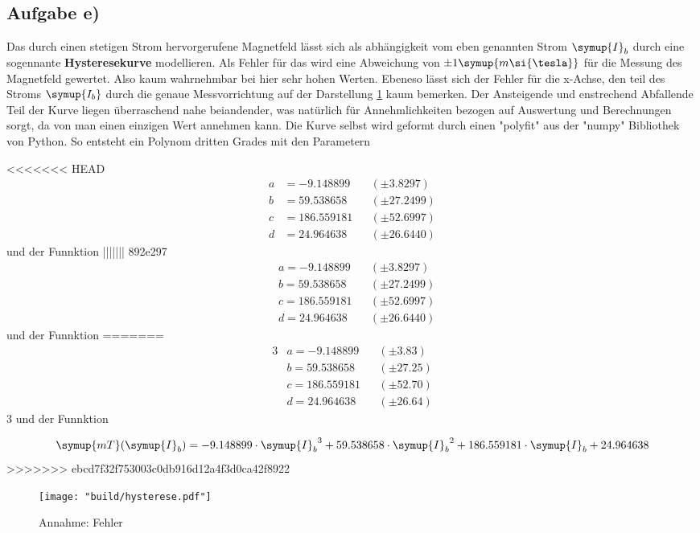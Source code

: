 \subsection{Aufgabe e)}
\label{sec:auswertung_hyst}

 
 Das durch einen stetigen Strom hervorgerufene Magnetfeld lässt sich als abhängigkeit vom eben genannten Strom $\symup{I}_b$ durch eine sogennante \textbf{Hysteresekurve} modellieren.
 Als Fehler für das wird eine Abweichung von $\pm 1 \symup{m\si{\tesla}}$ für die Messung des Magnetfeld gewertet. Also kaum wahrnehmbar bei hier sehr hohen Werten. Ebeneso lässt sich der Fehler für die x-Achse, den teil des Stroms 
 $\symup{I_b}$ durch die genaue Messvorrichtung auf der Darstellung \ref{fig:Bfeld} kaum bemerken.
 Der Ansteigende und enstrechend Abfallende Teil der Kurve liegen überraschend nahe beiandender, was natürlich für Annehmlichkeiten bezogen auf Auswertung und Berechnungen sorgt, da von man einen einzigen Wert annehmen kann.
 Die Kurve selbst wird geformt durch einen "polyfit" aus der "numpy" Bibliothek von Python. So entsteht ein Polynom dritten Grades mit den Parametern 

<<<<<<< HEAD
\begin{align*}
a &= -9.148899 &&(\pm 3.8297) \\
b &= 59.538658 &&(\pm 27.2499) \\
c &= 186.559181 &&(\pm 52.6997) \\
d &= 24.964638 &&(\pm 26.6440 )
\end{align*}
 und der Funnktion
||||||| 892e297
\begin{align*}
&a = -9.148899 &&(\pm 3.8297) \\
&b = 59.538658 &&(\pm 27.2499) \\
&c = 186.559181 &&(\pm 52.6997) \\
&d = 24.964638 &&(\pm 26.6440 )
\end{align*}
 und der Funnktion
=======
\begin{alignat*}{3}
&a = -9.148899 &&(\pm 3.83) \\
&b = 59.538658 &&(\pm 27.25) \\
&c = 186.559181 &&(\pm 52.70) \\
&d = 24.964638 &&(\pm 26.64)
\end{alignat*}{3}
und der Funnktion

\begin{equation}
\symup{mT}(\symup{I}_b)=-9.148899 \cdot {\symup{I}_b}^3 + 59.538658 \cdot {\symup{I}_b}^2 + 186.559181 \cdot {\symup{I}_b} + 24.964638
\end{equation}
>>>>>>> ebcd7f32f753003c0db916d12a4f3d0ca42f8922

\begin{figure}
    \centering
    \texttt{[image: "build/hysterese.pdf"]}
    \caption{Annahme: Fehler }
    \label{fig:Bfeld}
 \end{figure}
